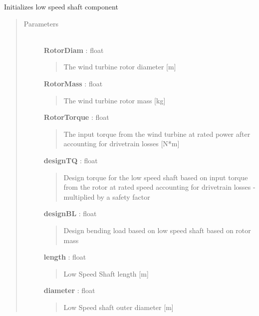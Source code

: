 \documentclass[letterpaper,10pt,openany,oneside]{sphinxmanual}
\begin{document}
\begin{fulllineitems}
\label{documentation:nacelleSE.src.nacelle_components.LowSpeedShaft}
Initializes low speed shaft component
\begin{quote}\begin{description}
\item[{Parameters }] \leavevmode\\
\textbf{RotorDiam} : float
\begin{quote}

The wind turbine rotor diameter {[}m{]}
\end{quote}

\textbf{RotorMass} : float
\begin{quote}

The wind turbine rotor mass {[}kg{]}
\end{quote}

\textbf{RotorTorque} : float
\begin{quote}

The input torque from the wind turbine at rated power after accounting for drivetrain losses {[}N*m{]}
\end{quote}

\textbf{designTQ} : float
\begin{quote}

Design torque for the low speed shaft based on input torque from the rotor at rated speed accounting for drivetrain losses - multiplied by a safety factor
\end{quote}

\textbf{designBL} : float
\begin{quote}

Design bending load based on low speed shaft based on rotor mass
\end{quote}

\textbf{length} : float
\begin{quote}

Low Speed Shaft length {[}m{]}
\end{quote}

\textbf{diameter} : float
\begin{quote}

Low Speed shaft outer diameter {[}m{]}
\end{quote}

\end{description}\end{quote}

\end{fulllineitems}
\end{document}
